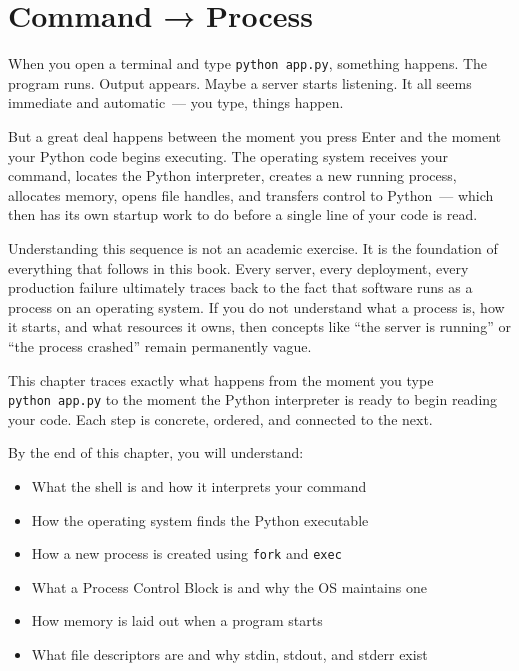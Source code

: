 \setcounter{chapter}{0}
\chapter{Command → Process}\label{ch:01-command-to-process}


\chapterrule

When you open a terminal and type \texttt{python\ app.py}, something happens. The program runs. Output appears. Maybe a server starts listening. It all seems immediate and automatic~--- you type, things happen.

But a great deal happens between the moment you press Enter and the moment your Python code begins executing. The operating system receives your command, locates the Python interpreter, creates a new running process, allocates memory, opens file handles, and transfers control to Python~--- which then has its own startup work to do before a single line of your code is read.

Understanding this sequence is not an academic exercise. It is the foundation of everything that follows in this book. Every server, every deployment, every production failure ultimately traces back to the fact that software runs as a process on an operating system. If you do not understand what a process is, how it starts, and what resources it owns, then concepts like ``the server is running'' or ``the process crashed'' remain permanently vague.

This chapter traces exactly what happens from the moment you type \texttt{python\ app.py} to the moment the Python interpreter is ready to begin reading your code. Each step is concrete, ordered, and connected to the next.

\begin{objectives}

By the end of this chapter, you will understand:

\begin{itemize}
\tightlist
\item
  What the shell is and how it interprets your command
\item
  How the operating system finds the Python executable
\item
  How a new process is created using \texttt{fork} and \texttt{exec}
\item
  What a Process Control Block is and why the OS maintains one
\item
  How memory is laid out when a program starts
\item
  What file descriptors are and why stdin, stdout, and stderr exist
\end{itemize}

\end{objectives}

